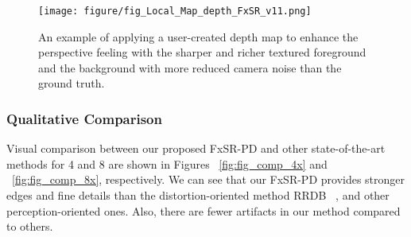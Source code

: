 \documentclass{article}
\begin{document}
\begin{figure*}[!t]
\centering
\scriptsize
\begin{minipage}[t]{1.0\linewidth}
    \centering
    {\texttt{[image: figure/fig\_Local\_Map\_depth\_FxSR\_v11.png]}}\vfill
\end{minipage}
\caption{An example of applying a user-created depth map to enhance the perspective feeling with the sharper and richer textured foreground and the background with more reduced camera noise than the ground truth.}
\label{fig:fig_Local_Map3}
\end{figure*}

\subsubsection{Qualitative Comparison} 
Visual comparison between our proposed FxSR-PD and other state-of-the-art methods for 4 and 8 are shown in Figures ~\ref{fig:fig_comp_4x} and ~\ref{fig:fig_comp_8x}, respectively. 
We can see that our FxSR-PD provides stronger edges and fine details than the distortion-oriented method RRDB ~\cite{2018esrgan}, and other perception-oriented ones. Also, there are fewer artifacts in our method compared to others.
\end{document}
